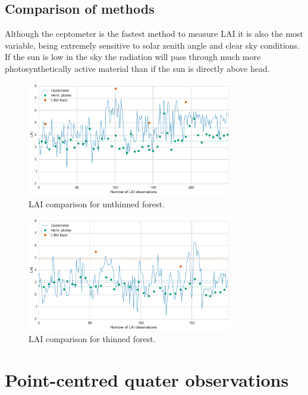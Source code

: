 \documentclass[11pt]{article}
\begin{document}
\subsection{Comparison of methods}

Although the ceptometer is the fastest method to measure LAI it is also the most variable, being extremely sensitive to solar zenith angle and clear sky conditions. If the sun is low in the sky the radiation will pass through much more photosynthetically active material than if the sun is directly above head.

\begin{figure}[ht]
    \centering
    \includegraphics[width=0.8\textwidth]{thinned07.pdf}
    \caption{LAI comparison for unthinned forest.} \label{fig:lai_comp07}
\end{figure}

\begin{figure}[ht]
    \centering
    \includegraphics[width=0.8\textwidth]{thinned14.pdf}
    \caption{LAI comparison for thinned forest.} \label{fig:lai_comp14}
\end{figure}

\section{Point-centred quater observations}
\end{document}
